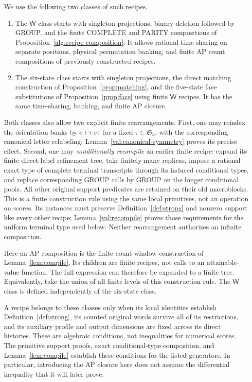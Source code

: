 We use the following two classes of such recipes.
\begin{enumerate}[label=\textup{(\alph*)}]
\item The $\mathsf W$ class starts with singleton projections, binary deletion
      followed by GROUP, and the finite COMPLETE and PARITY compositions
      of Proposition~\ref{alg:recipe-composition}.  It allows rational
      time-sharing on separate positions, physical permutation banking,
      and finite AP count compositions of previously constructed recipes.
\item The six-state class starts with singleton projections, the direct
      matching construction of Proposition~\ref{prop:matching}, and the
      five-state face substitutions of Proposition~\ref{prop:face} using
      finite $\mathsf W$ recipes.  It has the same time-sharing, banking, and finite
      AP closure.
\end{enumerate}
Both classes also allow two explicit finite rearrangements.  First, one
may reindex the orientation banks by $\sigma\mapsto\sigma\tau$ for a fixed
$\tau\in\mathfrak S_3$, with the corresponding canonical letter relabeling;
Lemma~\ref{val:canonical-symmetry} proves its precise effect.  Second, one
may \emph{conditionally recompile} an earlier finite recipe: expand its
finite direct-label refinement tree, take finitely many replicas, impose a
rational exact type of complete terminal transcripts through its induced
conditional types, and replace corresponding GROUP calls by GROUP on the
longer conditional pools.  All other original support predicates are retained
on their old macroblocks.  This is a finite construction rule using the same
local primitives, not an operation on scores.  Its instances must preserve
Definition~\ref{def:strong} and nonzero support like every other recipe;
Lemma~\ref{val:recompile} proves those requirements for the uniform terminal
type used below.  Neither rearrangement authorizes an infinite composition.

Here an AP composition is the finite count-window construction of
Lemma~\ref{lem:compile}.  Its children are finite recipes, not calls to an
attainable-value function.  The full expression can therefore be expanded to
a finite tree.  Equivalently, take the union of all finite levels of this
construction rule.  The $\mathsf W$ class is defined independently of the six-state
class.

A recipe belongs to these classes only when its local identities establish
Definition~\ref{def:strong}, its counted original words survive all of its
restrictions, and its auxiliary profile and output dimensions are fixed
across its direct histories.  These are algebraic conditions, not inequalities
for numerical scores.  The primitive support proofs, exact conditional-type
composition, and Lemma~\ref{lem:compile} establish these conditions for the
listed generators.  In particular, introducing the AP closure here does not
assume the differential inequality that it will later prove.

